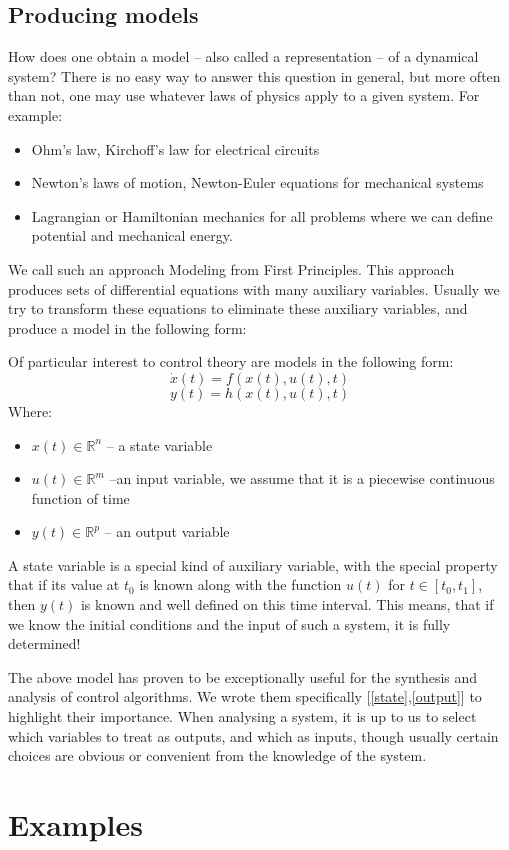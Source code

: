 \subsection{Producing models}
How does one obtain a model -- also called a representation -- of a dynamical system? There is no easy way to answer this question in general, but more often than not, one may use whatever laws of physics apply to a given system. For example:
\begin{itemize}
        \item Ohm's law, Kirchoff's law for electrical circuits
        \item Newton's laws of motion, Newton-Euler equations for mechanical systems
        \item Lagrangian or Hamiltonian mechanics for all problems where we can define potential and mechanical energy.
        
\end{itemize}
We call such an approach Modeling from First Principles. This approach produces sets of differential equations with many auxiliary variables. Usually we try to transform these equations to eliminate these auxiliary variables, and produce a model in the following form:
{
    Of particular interest to control theory are models in the following form:
    \begin{equation} \label{state}
        \dot{x}(t) = f(x(t),u(t),t)
    \end{equation}
    \begin{equation} \label{output}
        y(t) = h(x(t),u(t),t)
    \end{equation}
    Where:
    \begin{itemize}
            \item $x(t) \in \mathbb{R}^n$ -- a state variable
            \item $u(t) \in \mathbb{R}^m$ --an input variable, we assume that it is a piecewise continuous function of time
            \item $y(t) \in \mathbb{R}^p$ -- an output variable
    \end{itemize}
    A state variable is a special kind of auxiliary variable, with the special property that if its value at $t_0$ is known along with the function $u(t)$ for $t \in [t_0,t_1]$, then $y(t)$ is known and well defined on this time interval. This means, that if we know the initial conditions and the input of such a system, it is fully determined!
}
The above model has proven to be exceptionally useful for the synthesis and analysis of control algorithms. We wrote them specifically [\ref{state},\ref{output}] to highlight their importance. When analysing a system, it is up to us to select which variables to treat as outputs, and which as inputs, though usually certain choices are obvious or convenient from the knowledge of the system.

\section{Examples}

